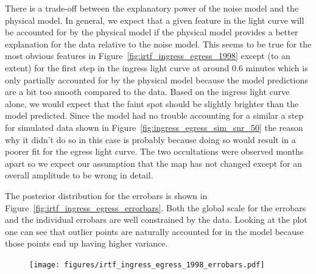 \documentclass[modern]{aastex62}
\begin{document}
There is a trade-off between the explanatory power of the noise model and the physical model. 
In general, we expect that a given feature in the light curve will be accounted for by the physical model if the physical model provides a better explanation for the data relative to the noise model.
This seems to be true for the most obvious features in Figure~\ref{fig:irtf_ingress_egress_1998} except (to an extent) for the first step in the ingress light curve at around 0.6 minutes which is only partially accounted for by the physical model because the model predictions are a bit too smooth compared to the data. 
Based on the ingress light curve alone, we would expect that the faint spot should be slightly brighter than the model predicted.
Since the model had no trouble accounting for a similar a step for simulated data shown in Figure~\ref{fig:ingress_egress_sim_snr_50} the reason why it didn't do so in this case is probably because doing so would result in a poorer fit for the egress light curve.
The two occultations were observed months apart so we expect our assumption that the map has not changed except for an overall amplitude to be wrong in detail.  

The posterior distribution for the errobars is shown in Figure~\ref{fig:irtf_ingress_egress_errorbars}.
Both the global scale for the errobars and the individual errobars are well constrained by the data. 
Looking at the plot one can see that outlier points are naturally accounted for in the model because those points end up having higher variance.

\begin{figure}[ht!]
    \begin{centering}
    \texttt{[image: figures/irtf\_ingress\_egress\_1998\_errobars.pdf]}
    \end{centering}
\end{figure}
\end{document}
